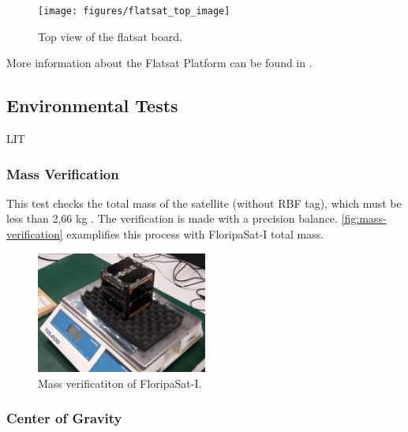 \begin{figure}[!ht]
    \begin{center}
        \texttt{[image: figures/flatsat\_top\_image]}
        \caption{Top view of the flatsat board.}
        \label{fig:flatsat-top}
    \end{center}
\end{figure}

More information about the Flatsat Platform can be found in \cite{flatsat}.

\subsection{Environmental Tests}

LIT

\cite{marcelino2021}

\subsubsection{Mass Verification}

This test checks the total mass of the satellite (without RBF tag), which must be less than 2,66 kg \cite{cds}. The verification is made with a precision balance. \autoref{fig:mass-verification} examplifies this process with FloripaSat-I total mass.

\begin{figure}[!ht]
    \begin{center}
        \includegraphics[width=0.5\textwidth]{figures/mass-test}
        \caption{Mass verificatiton of FloripaSat-I.}
        \label{fig:mass-verification}
    \end{center}
\end{figure}

\subsubsection{Center of Gravity}

